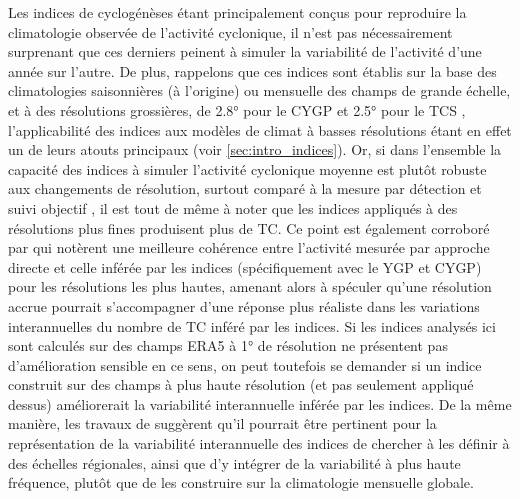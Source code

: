 \documentclass[../main.tex]{subfiles}
\begin{document}
Les indices de cyclogénèses étant principalement conçus pour reproduire la climatologie observée de l'activité cyclonique, il n'est pas nécessairement
surprenant que ces derniers peinent à simuler la variabilité de l'activité d'une année sur l'autre. De plus, rappelons que ces indices sont établis sur la base
des climatologies saisonnières (à l'origine) ou mensuelle des champs de grande échelle, et à des résolutions grossières, de \ang{2.8} pour le CYGP
\parencite{royer_gcm_1998} et \ang{2.5} pour le TCS \parencite{tippett_poisson_2011}, l'applicabilité des indices aux modèles de climat à basses résolutions
étant en effet un de leurs atouts principaux (voir \cref{sec:intro_indices}). Or, si dans l'ensemble la capacité des indices à simuler l'activité cyclonique
moyenne est plutôt robuste aux changements de résolution, surtout comparé à la mesure par détection et suivi objectif \parencite[][voir aussi
\cref{fig:GP_resolution}]{camargo_tropical_2007}, il est tout de même à noter que les indices appliqués à des résolutions plus fines produisent plus de TC. Ce
point est également corroboré par \textcite{mcdonald_tropical_2005} qui notèrent une meilleure cohérence entre l'activité mesurée par approche directe et celle
inférée par les indices (spécifiquement avec le YGP et CYGP) pour les résolutions les plus hautes, amenant alors \textcite{camargo_tropical_2007} à spéculer
qu'une résolution accrue pourrait s'accompagner d'une réponse plus réaliste dans les variations interannuelles du nombre de TC inféré par les indices. Si les
indices analysés ici sont calculés sur des champs ERA5 à \ang{1} de résolution ne présentent pas d'amélioration sensible en ce sens, on peut toutefois se
demander si un indice construit sur des champs à plus haute résolution (et pas seulement appliqué dessus) améliorerait la variabilité interannuelle inférée par
les indices. De la même manière, les travaux de \textcite{bruyere_investigating_2012,waters_largescale_2012} suggèrent qu'il pourrait être pertinent pour la
représentation de la variabilité interannuelle des indices de chercher à les définir à des échelles régionales, ainsi que d'y intégrer de la variabilité à plus
haute fréquence, plutôt que de les construire sur la climatologie mensuelle globale.
\end{document}
